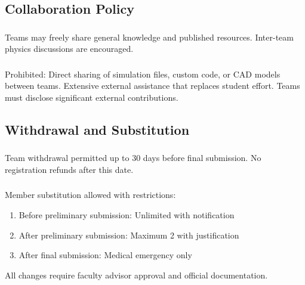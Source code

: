 \subsection{Collaboration Policy}

\subsubsection{}
Teams may freely share general knowledge and published resources. Inter-team physics discussions are encouraged.

\subsubsection{}
Prohibited: Direct sharing of simulation files, custom code, or CAD models between teams. Extensive external assistance that replaces student effort. Teams must disclose significant external contributions.

\subsection{Withdrawal and Substitution}

\subsubsection{}
Team withdrawal permitted up to 30 days before final submission. No registration refunds after this date.

\subsubsection{}
Member substitution allowed with restrictions:
\begin{enumerate}[noitemsep]
    \item Before preliminary submission: Unlimited with notification
    \item After preliminary submission: Maximum 2 with justification
    \item After final submission: Medical emergency only
\end{enumerate}

All changes require faculty advisor approval and official documentation.